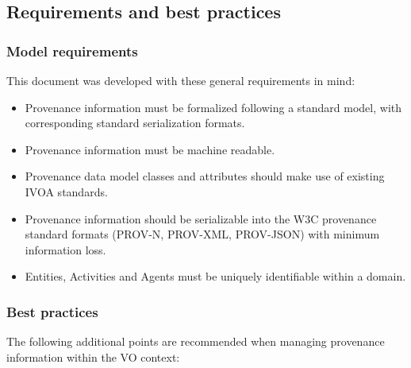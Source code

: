 \subsection{Requirements and best practices}
\label{sec:requirements}

\subsubsection{Model requirements}

This document was developed with these general requirements in mind:

\begin{itemize}


\item Provenance information must be formalized following a standard model, with corresponding standard serialization formats.

\item Provenance information must be machine readable.

\item Provenance data model classes and attributes should make use of existing IVOA standards.

\item Provenance information should be serializable into the W3C provenance standard formats (PROV-N, PROV-XML, PROV-JSON) with minimum information loss.

\item Entities, Activities and Agents must be uniquely identifiable within a domain.
\end{itemize}


\subsubsection{Best practices}

The following additional points are recommended when managing provenance information within the VO context:


